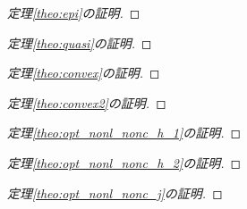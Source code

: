 \documentclass[dvipdfmx]{jsreport}
\begin{document}
\begin{proof}[定理\ref{theo:epi}の証明]

\end{proof}

\begin{proof}[定理\ref{theo:quasi}の証明]

\end{proof}

\begin{proof}[定理\ref{theo:convex}の証明]

\end{proof}

\begin{proof}[定理\ref{theo:convex2}の証明]

\end{proof}

\begin{proof}[定理\ref{theo:opt_nonl_nonc_h_1}の証明]

\end{proof}

\begin{proof}[定理\ref{theo:opt_nonl_nonc_h_2}の証明]

\end{proof}

\begin{proof}[定理\ref{theo:opt_nonl_nonc_j}の証明]

\end{proof}
\end{document}
